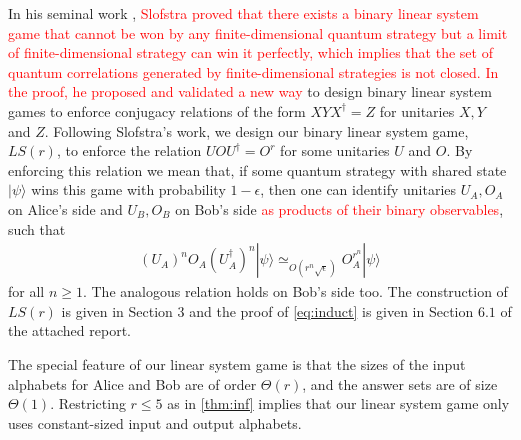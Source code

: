 \documentclass[11pt,letterpaper]{article}
\newcommand{\ket}[1]{|#1\rangle}
\newcommand{\x}{\otimes}
\newcommand{\ct}{^{\dagger}}
\newcommand{\1}{\mathbb{1}}
\newcommand{\LS}{LS}
\newcommand{\ep}{\epsilon}
\newcommand{\se}{\sqrt{\epsilon}}
\newcommand{\appd}[1]{\simeq_{#1}}
\newcommand{\hf}[1]{\textcolor{red}{#1}}
\theoremstyle{definition}
\begin{document}
In his seminal work \cite{slofstra2017}, \hf{Slofstra proved that 
there exists a binary linear system game that cannot be won by any finite-dimensional quantum strategy but a limit of 
finite-dimensional strategy can win it perfectly,
which implies that the set of quantum correlations generated by
finite-dimensional strategies is not closed.
In the proof, he proposed and validated a new way} 
to design binary linear system games to enforce conjugacy relations of the
form $X Y X\ct = Z$ for unitaries $X, Y$ and $Z$.
Following Slofstra's work, we design our binary linear system game, $\LS(r)$,
to enforce the relation $U O U\ct = O^r$ for some unitaries $U$ and $O$.
By enforcing this relation we mean that, 
if some quantum strategy with shared state $\ket{\psi}$
wins this game with probability $1 - \ep$,
then one can identify unitaries $U_A, O_A$ on Alice's side and
$U_B, O_B$ on Bob's side \hf{as products of their binary observables}, such that 
\begin{align}
\label{eq:induct}
	 (U_A)^n O_A (U_A\ct)^n \ket{\psi} \appd{O(r^{n} \se)}  O_A^{r^n} \ket{\psi}
\end{align}
for all $n \geq 1$.
The analogous relation holds on Bob's side too.
The construction of $\LS(r)$ is given in Section $3$ and
the proof of \cref{eq:induct} is given in Section $6.1$ of the attached report.


The special feature of our linear system game is that the sizes
of the input alphabets for Alice and Bob are of order $\Theta(r)$,
and the answer sets are of size $\Theta(1)$.
Restricting $r \leq 5$ as in \cref{thm:inf} implies that our linear system 
game only uses constant-sized input and output alphabets.

\end{document}
